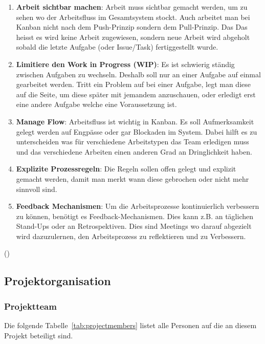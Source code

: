 \begin{enumerate}
    \item \textbf{Arbeit sichtbar machen}: Arbeit muss sichtbar gemacht werden, um zu sehen wo der Arbeitsfluss im Gesamtsystem stockt.
        Auch arbeitet man bei Kanban nicht nach dem Push-Prinzip sondern dem Pull-Prinzip. Das 
        Das heisst es wird keine Arbeit zugewiesen, sondern neue Arbeit wird abgeholt sobald die letzte Aufgabe (oder Issue/Task) fertiggestellt wurde.
    \item \textbf{Limitiere den Work in Progress (WIP)}: Es ist schwierig ständig zwischen Aufgaben zu wechseln. Deshalb soll nur an einer Aufgabe auf einmal gearbeitet werden. Tritt ein Problem auf bei einer Aufgabe, legt man diese auf die Seite, um diese später mit jemandem anzuschauen, oder erledigt erst eine andere Aufgabe welche eine Voraussetzung ist.
    \item \textbf{Manage Flow}: Arbeitsfluss ist wichtig in Kanban. Es soll Aufmerksamkeit gelegt werden auf Engpässe oder gar Blockaden im System. Dabei hilft es zu unterscheiden was für verschiedene Arbeitstypen das Team erledigen muss und das verschiedene Arbeiten einen anderen Grad an Dringlichkeit haben.
    \item \textbf{Explizite Prozessregeln}: Die Regeln sollen offen gelegt und explizit gemacht werden, damit man merkt wann diese gebrochen oder nicht mehr sinnvoll sind.
    \item \textbf{Feedback Mechanismen}: Um die Arbeitsprozesse kontinuierlich verbessern zu können, benötigt es Feedback-Mechanismen. Dies kann z.B. an täglichen Stand-Ups oder an Retrospektiven. Dies sind Meetings wo darauf abgezielt wird dazuzulernen, den Arbeitsprozess zu reflektieren und  zu Verbessern.
\end{enumerate}

(\cite[p.~17-22]{siegfried_kaltenecker_kanban_2013})

\subsection{Projektorganisation}

\subsubsection{Projektteam}

Die folgende Tabelle~\ref{tab:projectmembers} listet alle Personen auf die an diesem Projekt beteiligt sind.

